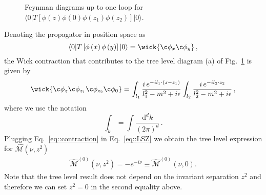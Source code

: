 \begin{figure}[h]
	\vspace*{5mm}
	\caption{Feynman diagrams up to one loop for $\langle 0 | T\left[\phi\left(z\right)\phi\left(0\right)\phi\left(z_1\right)\phi\left(z_2\right)\right]|0\rangle$.}
	\label{fig:2}
\end{figure}
%
Denoting the propagator in position space as
\begin{equation}
        \langle 0 | T\left[\phi\left(x\right)\phi\left(y\right)\right]|0\rangle = \wick{\c \phi_x \c \phi_{y} }   \, ,     
\end{equation}
the Wick contraction that contributes to the tree level diagram (a) of Fig.~\ref{fig:2} is given by 
\begin{align}
\label{eq::contraction}
        \wick{\c \phi_z \c \phi_{z_1} \c \phi_{z_2} \c \phi_{0}}=
        \int_{l_1} \frac{i \, e^{-i l_1 \cdot \left(z-z_1\right)}}{l_1^2 -m^2 + i\epsilon} \int_{l_2} 
        \frac{i\,e^{-i l_2 \cdot z_2}}{l_2^2 -m^2 + i\epsilon}\, ,
\end{align}
where we use the notation
\begin{equation}
        \int_k = \int \frac{\mathrm{d}^dk}{(2\pi)^d}\, .
\end{equation}
Plugging Eq.~\eqref{eq::contraction} in Eq.~\eqref{eq::LSZ} we obtain the tree
level expression for $\widehat{\mathcal{M}}\left(\nu, z^2\right)$
\begin{align}
\label{eq::treelevel}
        \widehat{\mathcal{M}}^{(0)}\left(\nu, z^2\right) = - e^{-i \nu} \equiv \widehat{\mathcal{M}}^{(0)}\left(\nu, 0\right) .
\end{align}
Note that the tree level result does not depend on the invariant separation $z^2$ and therefore we can set $z^2=0$ in the second equality above.

